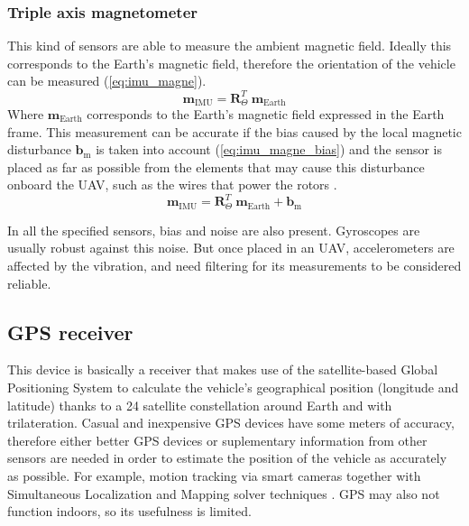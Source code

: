 \documentclass[journal]{IEEEtran}
\newcommand*{\subb}[1]{_{\mathrm{#1}}}
\begin{document}
	\subsubsection{Triple axis magnetometer} This kind of sensors are able to measure the ambient magnetic field. Ideally this corresponds to the Earth's magnetic field, therefore the orientation of the vehicle can be measured (\ref{eq:imu_magne}).
	\begin{equation} \label{eq:imu_magne}
	\bm{m}\subb{IMU}= \bm{R}^T_\Theta \  \bm{m}\subb{Earth}
	\end{equation}
	Where $\bm{m}\subb{Earth}$ corresponds to the Earth's magnetic field expressed in the Earth frame. This measurement can be accurate if the bias caused by the local magnetic disturbance $\bm{b}\subb{m}$ is taken into account (\ref{eq:imu_magne_bias}) and the sensor is placed as far as possible from the elements that may cause this disturbance onboard the UAV, such as the wires that power the rotors \cite{modelling_control_mahony}.
	\begin{equation} \label{eq:imu_magne_bias}
	\bm{m}\subb{IMU}= \bm{R}^T_\Theta \  \bm{m}\subb{Earth} + \bm{b}\subb{m}
	\end{equation}
	
	In all the specified sensors, bias and noise are also present. Gyroscopes are usually robust against this noise. But once placed in an UAV, accelerometers are affected by the vibration, and need filtering for its measurements to be considered reliable.
	
	\subsection{GPS receiver}
	This device is basically a receiver that makes use of the satellite-based Global Positioning System to calculate the vehicle's geographical position (longitude and latitude) thanks to a 24 satellite constellation around Earth and with trilateration. Casual and inexpensive GPS devices have some meters of accuracy, therefore either better GPS devices or suplementary information from other sensors are needed in order to estimate the position of the vehicle as accurately as possible. For example, motion tracking via smart cameras together with Simultaneous Localization and Mapping solver techniques \cite{modelling_control_mahony}. GPS may also not function indoors, so its usefulness is limited.
	
\end{document}
